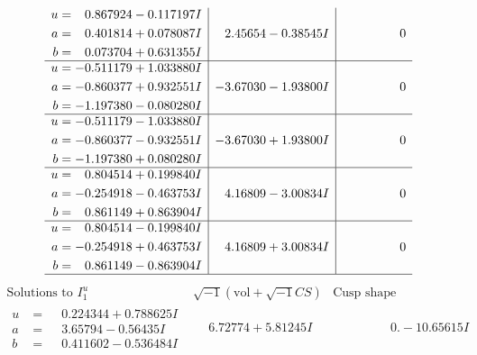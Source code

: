 \documentclass[1p]{elsarticle_modified}
\theoremstyle{definition}
\newcommand{\I}{\sqrt{-1}}
\begin{document}
$$\begin{array}{c|c|c}
\begin{aligned}
u &= \phantom{-}0.867924 - 0.117197 I \\
a &= \phantom{-}0.401814 + 0.078087 I \\
b &= \phantom{-}0.073704 + 0.631355 I\end{aligned}
 & \phantom{-}2.45654 - 0.38545 I & \phantom{-0.000000 } 0 \\ \hline\begin{aligned}
u &= -0.511179 + 1.033880 I \\
a &= -0.860377 + 0.932551 I \\
b &= -1.197380 - 0.080280 I\end{aligned}
 & -3.67030 - 1.93800 I & \phantom{-0.000000 } 0 \\ \hline\begin{aligned}
u &= -0.511179 - 1.033880 I \\
a &= -0.860377 - 0.932551 I \\
b &= -1.197380 + 0.080280 I\end{aligned}
 & -3.67030 + 1.93800 I & \phantom{-0.000000 } 0 \\ \hline\begin{aligned}
u &= \phantom{-}0.804514 + 0.199840 I \\
a &= -0.254918 - 0.463753 I \\
b &= \phantom{-}0.861149 + 0.863904 I\end{aligned}
 & \phantom{-}4.16809 - 3.00834 I & \phantom{-0.000000 } 0 \\ \hline\begin{aligned}
u &= \phantom{-}0.804514 - 0.199840 I \\
a &= -0.254918 + 0.463753 I \\
b &= \phantom{-}0.861149 - 0.863904 I\end{aligned}
 & \phantom{-}4.16809 + 3.00834 I & \phantom{-0.000000 } 0\\
 \hline 
 \end{array}$$\newpage$$\begin{array}{c|c|c}  
\text{Solutions to }I^u_{1}& \I (\text{vol} + \sqrt{-1}CS) & \text{Cusp shape}\\
 \hline 
\begin{aligned}
u &= \phantom{-}0.224344 + 0.788625 I \\
a &= \phantom{-}3.65794 - 0.56435 I \\
b &= \phantom{-}0.411602 - 0.536484 I\end{aligned}
 & \phantom{-}6.72774 + 5.81245 I & \phantom{-0.000000 } 0. - 10.65615 I \\ \hline\begin{aligned}

\end{aligned}
\end{array}$$
\end{document}
